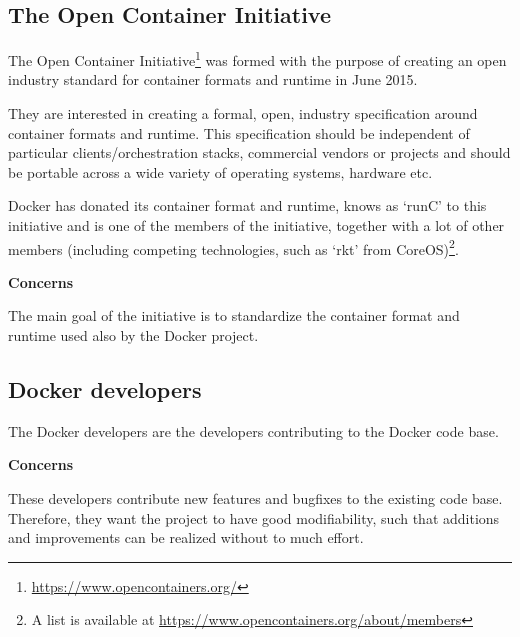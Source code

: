 \subsection*{The Open Container Initiative}

The Open Container Initiative\footnote{\url{https://www.opencontainers.org/}} was formed with the purpose of creating an open industry standard for container formats and runtime in June 2015.

They are interested in creating a formal, open, industry specification around container formats and runtime. This specification should be independent of particular clients/orchestration stacks, commercial vendors or projects and should be portable across a wide variety of operating systems, hardware etc.

Docker has donated its container format and runtime, knows as `runC' to this initiative and is one of the members of the initiative, together with a lot of other members (including competing technologies, such as `rkt' from CoreOS)\footnote{A list is available at \url{https://www.opencontainers.org/about/members}}.

\textbf{Concerns}
\begin{description}[labelindent=25pt,style=multiline,leftmargin=4.0cm,font=\normalfont\itshape]

\item[Portability] The main goal of the initiative is to standardize the container format and runtime used also by the Docker project.

\end{description}

\subsection*{Docker developers}
The Docker developers are the developers contributing to the Docker code base.

\textbf{Concerns}
\begin{description}[labelindent=25pt,style=multiline,leftmargin=4.0cm,font=\normalfont\itshape]

\item[Maintainability] These developers contribute new features and bugfixes to the existing code base. Therefore, they want the project to have good modifiability, such that additions and improvements can be realized without to much effort.

\end{description}

